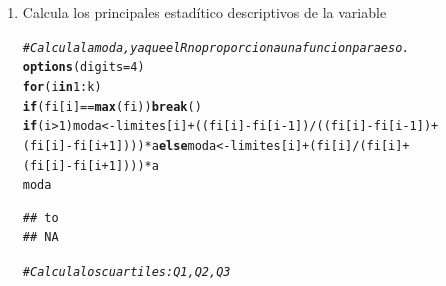 \documentclass[12pt,letterpaper]{article}\usepackage[]{graphicx}\usepackage[]{color}
\makeatletter
\newcommand{\hlnum}[1]{\textcolor[rgb]{0.686,0.059,0.569}{#1}}%
\newcommand{\hlcom}[1]{\textcolor[rgb]{0.678,0.584,0.686}{\textit{#1}}}%
\newcommand{\hlopt}[1]{\textcolor[rgb]{0,0,0}{#1}}%
\newcommand{\hlstd}[1]{\textcolor[rgb]{0.345,0.345,0.345}{#1}}%
\newcommand{\hlkwa}[1]{\textcolor[rgb]{0.161,0.373,0.58}{\textbf{#1}}}%
\newcommand{\hlkwb}[1]{\textcolor[rgb]{0.69,0.353,0.396}{#1}}%
\newcommand{\hlkwc}[1]{\textcolor[rgb]{0.333,0.667,0.333}{#1}}%
\newcommand{\hlkwd}[1]{\textcolor[rgb]{0.737,0.353,0.396}{\textbf{#1}}}%
\newenvironment{kframe}{%
 \def\at@end@of@kframe{}%
 \ifinner\ifhmode%
  \def\at@end@of@kframe{\end{minipage}}%
  \begin{minipage}{\columnwidth}%
 \fi\fi%
 \def\FrameCommand##1{\hskip\@totalleftmargin \hskip-\fboxsep
 \colorbox{shadecolor}{##1}\hskip-\fboxsep
     \hskip-\linewidth \hskip-\@totalleftmargin \hskip\columnwidth}%
 \MakeFramed {\advance\hsize-\width
   \@totalleftmargin\z@ \linewidth\hsize
   \@setminipage}}%
 {\par\unskip\endMakeFramed%
 \at@end@of@kframe}
\newenvironment{knitrout}{}{} %
\makeatother
\begin{document}
\begin{enumerate}
\item  Calcula los principales estad\'itico descriptivos de la variable
\begin{knitrout}
\color{fgcolor}\begin{kframe}
\begin{alltt}
\hlcom{# Calcula la moda, ya que el R no proporciona una funcion para eso.}
\hlkwd{options}\hlstd{(}\hlkwc{digits}\hlstd{=}\hlnum{4}\hlstd{)}
\hlkwa{for}\hlstd{(i} \hlkwa{in} \hlnum{1}\hlopt{:}\hlstd{k)}
  \hlkwa{if} \hlstd{(fi[i]} \hlopt{==} \hlkwd{max}\hlstd{(fi))} \hlkwa{break}\hlstd{()}
\hlkwa{if}\hlstd{(i} \hlopt{>} \hlnum{1}\hlstd{) moda} \hlkwb{<-} \hlstd{limites[i]}\hlopt{+}\hlstd{((fi[i]}\hlopt{-}\hlstd{fi[i}\hlopt{-}\hlnum{1}\hlstd{])}\hlopt{/}\hlstd{((fi[i]}\hlopt{-}\hlstd{fi[i}\hlopt{-}\hlnum{1}\hlstd{])}\hlopt{+}
 \hlstd{(fi[i]}\hlopt{-}\hlstd{fi[i}\hlopt{+}\hlnum{1}\hlstd{]) ))}\hlopt{*}\hlstd{a} \hlkwa{else} \hlstd{moda} \hlkwb{<-} \hlstd{limites[i]}\hlopt{+}\hlstd{(fi[i]}\hlopt{/}\hlstd{(fi[i]}\hlopt{+}
                          \hlstd{(fi[i]}\hlopt{-}\hlstd{fi[i}\hlopt{+}\hlnum{1}\hlstd{])))}\hlopt{*}\hlstd{a}
\hlstd{moda}
\end{alltt}
\begin{verbatim}
## to 
## NA
\end{verbatim}
\end{kframe}
\end{knitrout}

\begin{knitrout}
\color{fgcolor}\begin{kframe}
\begin{alltt}
\hlcom{# Calcula los cuartiles: Q1, Q2, Q3}


\end{alltt}
\end{kframe}
\end{knitrout}
\end{enumerate}
\end{document}
